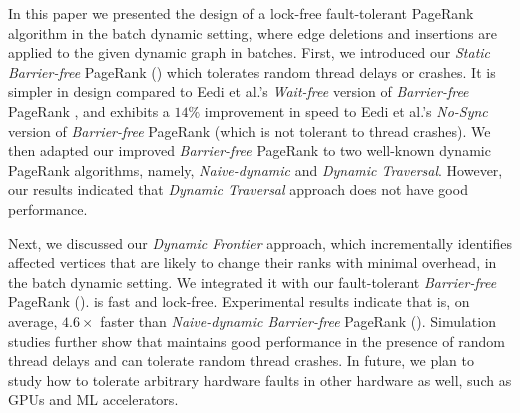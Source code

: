 In this paper we presented the design of a lock-free fault-tolerant PageRank algorithm in the batch dynamic setting, where edge deletions and insertions are applied to the given dynamic graph in batches. First, we introduced our \textit{Static Barrier-free} PageRank (\StaBarf{}) which tolerates random thread delays or crashes. It is simpler in design compared to Eedi et al.'s \textit{Wait-free} version of \textit{Barrier-free} PageRank \cite{rank-eedi22}, and exhibits a $14\%$ improvement in speed to Eedi et al.'s \textit{No-Sync} version of \textit{Barrier-free} PageRank (which is not tolerant to thread crashes). We then adapted our improved \textit{Barrier-free} PageRank to two well-known dynamic PageRank algorithms, namely, \textit{Naive-dynamic} and \textit{Dynamic Traversal}. However, our results indicated that \textit{Dynamic Traversal} approach does not have good performance.

Next, we discussed our \textit{Dynamic Frontier} approach, which incrementally identifies affected vertices that are likely to change their ranks with minimal overhead, in the batch dynamic setting. We integrated it with our fault-tolerant \textit{Barrier-free} PageRank (\FroBarf{}). \FroBarf{} is fast and lock-free. Experimental results indicate that \FroBarf{} is, on average, $4.6\times$ faster than \textit{Naive-dynamic Barrier-free} PageRank (\NaiBarf{}). Simulation studies further show that \FroBarf{} maintains good performance in the presence of random thread delays and can tolerate random thread crashes. In future, we plan to study how to tolerate arbitrary hardware faults in other hardware as well, such as GPUs and ML accelerators.

